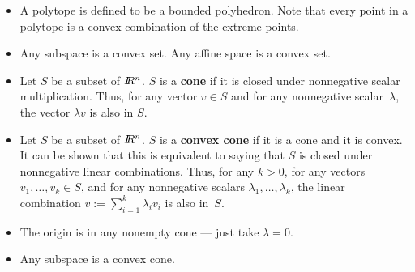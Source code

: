 \begin{itemize}
 \item
A polytope is defined to be a bounded polyhedron.
Note that every point in a polytope is a convex combination of the
extreme points.
 \item
Any subspace is a convex set.
Any affine space is a convex set.
 \item
Let $S$ be a subset of $I\!\!R^n$. $S$ is a {\bf cone}
if it is closed under nonnegative scalar multiplication.
Thus, for any vector $v\in S$ and for any nonnegative scalar~$\lambda$,
the vector $\lambda v$ is also in $S$.
 \item
Let $S$ be a subset of $I\!\!R^n$. $S$ is a {\bf convex cone}
if it is a cone and it is convex.
It can be shown that this is equivalent to saying that $S$
is closed under nonnegative linear combinations.
Thus, for any $k>0$, for any vectors $v_1,\ldots,v_k \in S$,
and for any nonnegative scalars $\lambda_1,\ldots,\lambda_k$,
the linear combination $v:=\sum_{i=1}^k\lambda_iv_i$ is also in~$S$.
 \item
The origin is in any nonempty cone --- just take $\lambda=0$.
 \item
Any subspace is a convex cone.
\end{itemize}



